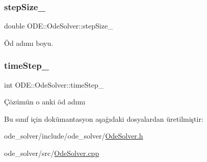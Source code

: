 \subsubsection{\texorpdfstring{stepSize\_}{stepSize\_}}
{\footnotesize\ttfamily double O\+D\+E\+::\+Ode\+Solver\+::step\+Size\+\_\+\hspace{0.3cm}{\ttfamily [protected]}}



Öd adımı boyu. 

\mbox{\label{classODE_1_1OdeSolver_a9a3f37006f576b0e7bd056a8e59a0f9e}} 
\subsubsection{\texorpdfstring{timeStep\_}{timeStep\_}}
{\footnotesize\ttfamily int O\+D\+E\+::\+Ode\+Solver\+::time\+Step\+\_\+\hspace{0.3cm}{\ttfamily [protected]}}



Çözümün o anki öd adımı 



Bu sınıf için dokümantasyon aşağıdaki dosyalardan üretilmiştir\+:\begin{DoxyCompactItemize}
\item 
ode\+\_\+solver/include/ode\+\_\+solver/\mbox{\hyperlink{OdeSolver_8h}{Ode\+Solver.\+h}}\item 
ode\+\_\+solver/src/\mbox{\hyperlink{OdeSolver_8cpp}{Ode\+Solver.\+cpp}}\end{DoxyCompactItemize}
